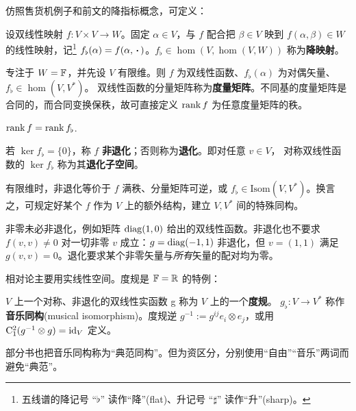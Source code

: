 仿照售货机例子和前文的降指标概念，可定义：

\begin{definition}
    设双线性映射 $f:V\times V\to W$。固定 $\alpha\in V$，与 $f$ 配合把 $\beta\in V$ 映到 $f(\alpha,\beta)\in W$ 的线性映射，记\footnote{五线谱的降记号 “$\flat$” 读作“降”(flat)、升记号 “$\sharp$” 读作“升”(sharp)。} $f_\flat(\alpha)=f(\alpha,\oo)$。$f_\flat\in\hom(V,\hom(V,W))$ 称为\textbf{降映射}。
\end{definition}


专注于 $W=\mathbb{F}$，并先设 $V$ 有限维。则 $f$ 为双线性函数、$f_\flat(\alpha)$ 为对偶矢量、$f_\flat\in\hom(V,V^*)$。
双线性函数的分量矩阵称为\textbf{度量矩阵}。不同基的度量矩阵是合同的，而合同变换保秩，故可直接定义 $\rank f$ 为任意度量矩阵的秩。

\begin{theorem}
    $\rank f=\rank f_\flat$.
\end{theorem}

\begin{definition}\label{def:nondegenerate-bilinear}
    若 $\ker f_\flat=\{0\}$，称 $f$ \textbf{非退化}；否则称为\textbf{退化}。即对任意 $v\in V$，
    对称双线性函数的 $\ker f_\flat$ 称为其\textbf{退化子空间}。
\end{definition}
有限维时，非退化等价于 $f$ 满秩、分量矩阵可逆，或 $f_\flat\in\mathrm{Isom}(V,V^*)$。换言之，可规定好某个 $f$ 作为 $V$ 上的额外结构，建立 $V,V^*$ 间的特殊同构。

\begin{remark}
    非零未必非退化，例如矩阵 $\operatorname{diag}(1,0)$ 给出的双线性函数。非退化也不要求 $f(v,v)\ne0$ 对一切非零 $v$ 成立：$g=\operatorname{diag}(-1,1)$ 非退化，但 $v=(1,1)$ 满足 $g(v,v)=0$。退化要求某个非零矢量与\emph{所有}矢量的配对均为零。
\end{remark}

相对论主要用实线性空间。度规是 $\mathbb{F}=\mathbb{R}$ 的特例：

\begin{definition}
    $V$ 上一个对称、非退化的双线性实函数 g 称为 $V$ 上的一个\textbf{度规}。 $g_\flat:V\to V^*$ 称作\textbf{音乐同构}(musical isomorphism)。度规逆 $g^{-1}:=g^{ij} e_i\otimes e_j$，或用 $\mathrm{C}_1^2(g^{-1}\otimes g)=\mathrm{id}_V$ 定义。
\end{definition}

\begin{remark}
    部分书也把音乐同构称为“典范同构”。但为资区分，分别使用“自由”“音乐”两词而避免“典范”。
\end{remark}

